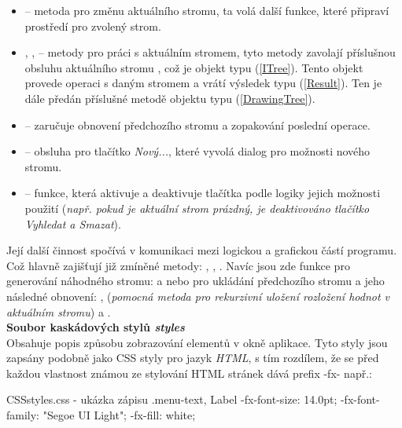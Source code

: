 \documentclass[
  biblatex=false,
  font=serif,
  glossaries=false,
  tables=false,
  theorems=false,
  index
]{kidiplom}
\begin{document}
\begin{itemize}
\item {} -- metoda pro změnu aktuálního stromu, ta volá další funkce, které připraví prostředí pro zvolený strom.

\item {},  ,  \label{zakladniMetody} -- metody pro práci s aktuálním stromem, tyto metody zavolají příslušnou obsluhu aktuálního stromu , což je objekt typu  (\ref{ITree}). Tento objekt provede operaci s daným stromem a vrátí výsledek typu  (\ref{Result}). Ten je dále předán příslušné metodě objektu  typu  (\ref{DrawingTree}).

\item {} -- zaručuje obnovení předchozího stromu a zopakování poslední operace.

\item {} -- obsluha pro tlačítko \textit{Nový...}, které vyvolá dialog pro možnosti nového stromu.

\item {} -- funkce, která aktivuje a deaktivuje tlačítka podle logiky jejich možnosti použití (\textit{např. pokud je aktuální strom prázdný, je deaktivováno tlačítko Vyhledat a Smazat}).
\end{itemize}

\indent Její další činnost spočívá v komunikaci mezi logickou a grafickou částí programu. Což hlavně zajišťují již zmíněné metody: ,  , . Navíc jsou zde funkce pro generování náhodného stromu:  a  nebo pro ukládání předchozího stromu a jeho následné obnovení: ,  (\textit{pomocná metoda pro rekurzivní uložení rozložení hodnot v aktuálním stromu}) a .\\

\noindent \textbf{Soubor kaskádových stylů \textit{styles}}\\
\indent Obsahuje popis způsobu zobrazování elementů v okně aplikace. Tyto styly jsou zapsány podobně jako CSS styly pro jazyk \textit{HTML}, s tím rozdílem, že se před každou vlastnost známou ze stylování HTML stránek dává prefix -fx- např.:
\begin{kicode}{CSS}{}{styles.css - ukázka zápisu}
.menu-text, Label  {
    -fx-font-size: 14.0pt;
    -fx-font-family: "Segoe UI Light";
    -fx-fill: white;
}
\end{kicode}
\end{document}
